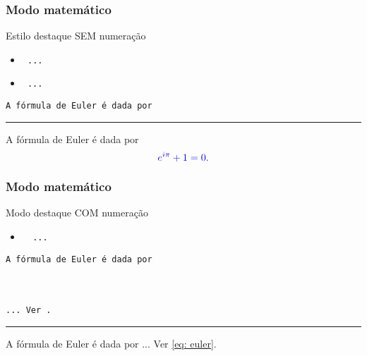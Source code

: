 \begin{frame}
  \frametitle{Modo matemático}

  \begin{block}{Estilo destaque SEM numeração}
    \begin{itemize}
    \item \texttt{\blue{\string\[} ...\ \blue{\string\]}}
    \item \texttt{\ ...\ }
    \end{itemize}
  \end{block}

\begin{exemplo}
  \texttt{A fórmula de Euler é dada por\\
  \blue{\string\[\\
  \mbox{}\ \ e\^{}\ac{}i\string\pi\fc{} + 1 = 0.\\
  \string\]}}

  \bigskip\hrule\bigskip

  A fórmula de Euler é dada por
  \[ \textcolor{blue}{e^{i\pi} + 1 = 0.}\]\smallskip
\end{exemplo}
\end{frame}

\begin{frame}
  \frametitle{Modo matemático}
  \begin{block}{Modo destaque COM numeração}
    \begin{itemize}
    \item \texttt{%
        \ ...\ }
    \end{itemize}
  \end{block}

\begin{exemplo}
  \texttt{A fórmula de Euler é dada por\\
     \\
      \mbox{}\ \  \\
      \\
    ... Ver .}

  \medskip\hrule\medskip

  A fórmula de Euler é dada por
  ... Ver \eqref{eq: euler}.
\end{exemplo}
\end{frame}


